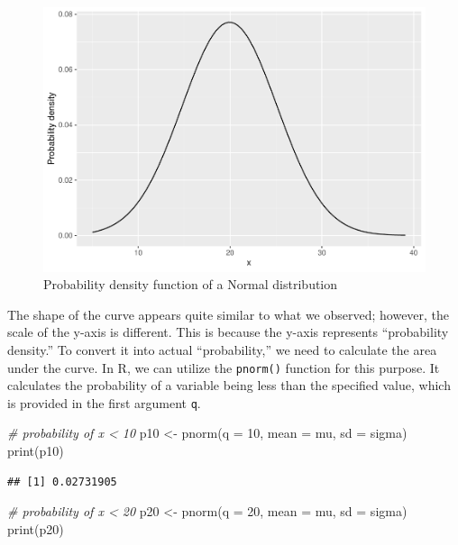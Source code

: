 \documentclass[
]{book}
\newenvironment{Shaded}{\begin{snugshade}}{\end{snugshade}}
\newcommand{\AttributeTok}[1]{\textcolor[rgb]{0.77,0.63,0.00}{#1}}
\newcommand{\CommentTok}[1]{\textcolor[rgb]{0.56,0.35,0.01}{\textit{#1}}}
\newcommand{\DecValTok}[1]{\textcolor[rgb]{0.00,0.00,0.81}{#1}}
\newcommand{\FunctionTok}[1]{\textcolor[rgb]{0.00,0.00,0.00}{#1}}
\newcommand{\NormalTok}[1]{#1}
\newcommand{\OtherTok}[1]{\textcolor[rgb]{0.56,0.35,0.01}{#1}}
\begin{document}
\begin{figure}

{\centering \includegraphics{_main_files/figure-latex/dnorm-1} 

}

\caption{Probability density function of a Normal distribution}\label{fig:dnorm}
\end{figure}

The shape of the curve appears quite similar to what we observed; however, the scale of the y-axis is different. This is because the y-axis represents ``probability density.'' To convert it into actual ``probability,'' we need to calculate the area under the curve. In R, we can utilize the \texttt{pnorm()} function for this purpose. It calculates the probability of a variable being less than the specified value, which is provided in the first argument \texttt{q}.

\begin{Shaded}
\begin{Highlighting}[]
\CommentTok{\# probability of x \textless{} 10}
\NormalTok{p10 }\OtherTok{\textless{}{-}} \FunctionTok{pnorm}\NormalTok{(}\AttributeTok{q =} \DecValTok{10}\NormalTok{, }\AttributeTok{mean =}\NormalTok{ mu, }\AttributeTok{sd =}\NormalTok{ sigma)}
\FunctionTok{print}\NormalTok{(p10)}
\end{Highlighting}
\end{Shaded}

\begin{verbatim}
## [1] 0.02731905
\end{verbatim}

\begin{Shaded}
\begin{Highlighting}[]
\CommentTok{\# probability of x \textless{} 20}
\NormalTok{p20 }\OtherTok{\textless{}{-}} \FunctionTok{pnorm}\NormalTok{(}\AttributeTok{q =} \DecValTok{20}\NormalTok{, }\AttributeTok{mean =}\NormalTok{ mu, }\AttributeTok{sd =}\NormalTok{ sigma)}
\FunctionTok{print}\NormalTok{(p20)}
\end{Highlighting}
\end{Shaded}
\end{document}
